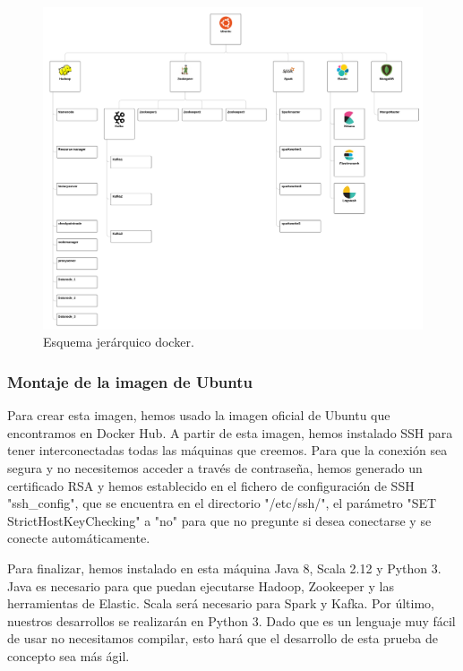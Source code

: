 \begin{figure}[htp]
\centering
\includegraphics[scale=0.20]{Imagenes/arqProp2.png}
\caption{Esquema jerárquico docker.}
\label{lmdarq2}
\end{figure}

\subsubsection{Montaje de la imagen de Ubuntu\label{montUbuntu}}

Para crear esta imagen, hemos usado la imagen oficial de Ubuntu que encontramos en Docker Hub. A partir de esta imagen, hemos instalado SSH para tener interconectadas todas las máquinas que creemos. Para que la conexión sea segura y no necesitemos acceder a través de contraseña, hemos generado un certificado RSA y hemos establecido en el fichero de configuración de SSH "ssh\_config", que se encuentra en el directorio "/etc/ssh/", el parámetro  "SET StrictHostKeyChecking" a  "no" para que no pregunte si desea conectarse y se conecte automáticamente.\par

Para finalizar, hemos instalado en esta máquina Java 8, Scala 2.12 y Python 3. Java es necesario para que puedan ejecutarse Hadoop, Zookeeper y las herramientas de Elastic. Scala será necesario para Spark y Kafka. Por último, nuestros desarrollos se realizarán en Python 3. Dado que es un lenguaje muy fácil de usar no necesitamos compilar, esto hará que el desarrollo de esta prueba de concepto sea más ágil.\par

